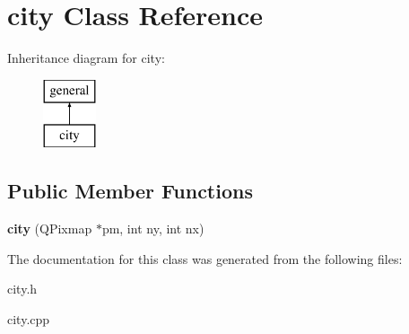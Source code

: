 \hypertarget{classcity}{\section{city \-Class \-Reference}
\label{classcity}
}
\-Inheritance diagram for city\-:\begin{figure}[H]
\begin{center}
\leavevmode
\includegraphics[height=2.000000cm]{classcity}
\end{center}
\end{figure}
\subsection*{\-Public \-Member \-Functions}
\begin{DoxyCompactItemize}
\item 
\hypertarget{classcity_a56729a7dec1256c0e06d0e89cc8aa1fa}{{\bfseries city} (\-Q\-Pixmap $\ast$pm, int ny, int nx)}\label{classcity_a56729a7dec1256c0e06d0e89cc8aa1fa}

\end{DoxyCompactItemize}


\-The documentation for this class was generated from the following files\-:\begin{DoxyCompactItemize}
\item 
city.\-h\item 
city.\-cpp\end{DoxyCompactItemize}
